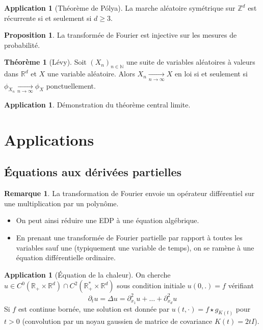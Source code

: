 \documentclass[11pt,a4paper,twocolumn]{article}
\theoremstyle{definition}
\newtheorem{proposition}[equation]{Proposition}
\newtheorem{theorem}[equation]{Théorème}
\newtheorem{application}[equation]{Application}
\newtheorem{remark}[equation]{Remarque}
\newcounter{n}
\def\Z{\mathbb{Z}}
\def\N{\mathbb{N}}
\def\R{\mathbb{R}}
\begin{document}
\begin{application}[Théorème de Pólya]
  La marche aléatoire symétrique sur $\Z^d$ est récurrente si et seulement si $d
  \geq 3$.
\end{application}

\begin{proposition}
  La transformée de Fourier est injective sur les mesures de probabilité.
\end{proposition}

\begin{theorem}[Lévy]
  Soit $(X_n)_{n \in \N}$ une suite de variables aléatoires à valeurs dans
  $\R^d$ et $X$ une variable aléatoire. Alors $X_n \underset{n \to
    \infty}{\longrightarrow} X$ en loi si et seulement si $\phi_{X_n}
  \underset{n \to \infty}{\longrightarrow} \phi_X$ ponctuellement.
\end{theorem}

\begin{application}
  Démonstration du théorème central limite.
\end{application}

\section{Applications}

\subsection{Équations aux dérivées partielles}

\begin{remark}
  La transformation de Fourier envoie un opérateur différentiel sur une
  multiplication par un polynôme.
  \begin{itemize}
  \item On peut ainsi réduire une EDP à une équation algébrique.
  \item En prenant une transformée de Fourier partielle par rapport à toutes les
    variables sauf une (typiquement une variable de temps), on se ramène à une
    équation différentielle ordinaire.
  \end{itemize}
\end{remark}

\begin{application}[Équation de la chaleur]
  On cherche $u \in C^0(\R_+ \times \R^d) \cap C^2(\R_+^* \times \R^d)$
  sous condition initiale $u(0, .) = f$ vérifiant
  \[ \partial_t u = \Delta u = \partial^2_{x_1} u + \ldots + \partial^2_{x_d} u \]
  Si $f$ est continue bornée, une solution est donnée par $u(t, \cdot) = f \star
  g_{K(t)}$ pour $t > 0$ (convolution par un noyau gaussien de matrice de
  covariance $K(t) = 2tI$).
\end{application}
\end{document}
